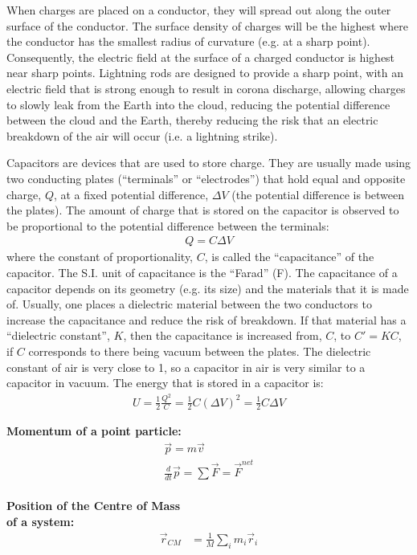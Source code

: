 \begin{chapterSummary}
When charges are placed on a conductor, they will spread out along the outer surface of the conductor. The surface density of charges will be the highest where the conductor has the smallest radius of curvature (e.g. at a sharp point). Consequently, the electric field at the surface of a charged conductor is highest near sharp points. Lightning rods are designed to provide a sharp point, with an electric field that is strong enough to result in corona discharge, allowing charges to slowly leak from the Earth into the cloud, reducing the potential difference between the cloud and the Earth, thereby reducing the risk that an electric breakdown of the air will occur (i.e. a lightning strike). 

Capacitors are devices that are used to store charge. They are usually made using two conducting plates (``terminals'' or ``electrodes'') that hold equal and opposite charge, $Q$, at a fixed potential difference, $\Delta V$ (the potential difference is between the plates). The amount of charge that is stored on the capacitor is observed to be proportional to the potential difference between the terminals:
\begin{align*}
Q=C\Delta V
\end{align*}
where the constant of proportionality, $C$, is called the ``capacitance'' of the capacitor. The S.I. unit of capacitance is the ``Farad'' (F). The capacitance of a capacitor depends on its geometry (e.g. its size) and the materials that it is made of. Usually, one places a dielectric material between the two conductors to increase the capacitance and reduce the risk of breakdown. If that material has a ``dielectric constant'', $K$, then the capacitance is increased from, $C$, to $C'=KC$, if $C$ corresponds to there being vacuum between the plates. The dielectric constant of air is very close to 1, so a capacitor in air is very similar to a capacitor in vacuum. The energy that is stored in a capacitor is:
\begin{align*}
U = \frac{1}{2}\frac{Q^2}{C} = \frac{1}{2}C(\Delta V)^2=\frac{1}{2}C\Delta V
\end{align*}


\end{chapterSummary}

\newpage
\begin{importantEquations}
\medskip
\begin{multicols}{2}
\textbf{Momentum of a point particle:}
\begin{align*}
\vec p = m\vec v \\
\frac{d}{dt}\vec p = \sum \vec F = \vec F^{net}
\end{align*}
\columnbreak
\\
\textbf{Position of the Centre of Mass \\ of a system:}
\begin{align*}
\vec r_{CM} &=\frac{1}{M}\sum_i m_i\vec r_i 
\end{align*}
\medskip
\end{multicols}
\end{importantEquations}

